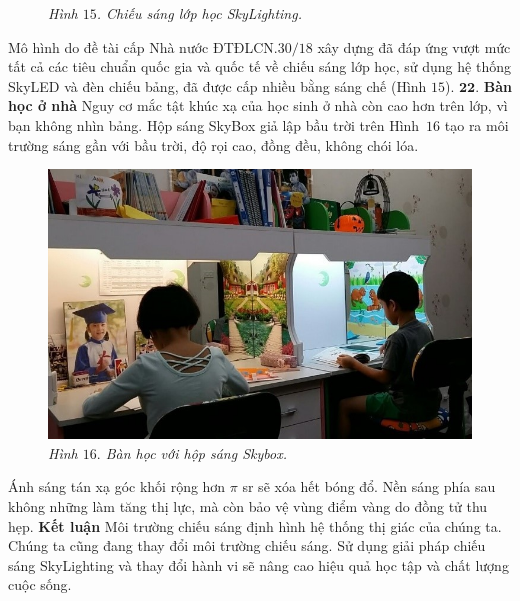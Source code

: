 \begin{multicols}{2}
\begin{figure}[H]
		\caption{\small\textit{\color{timhieukhoahoc}Hình $15$. Chiếu sáng lớp học SkyLighting.}}
		\vspace*{-10pt}
	\end{figure}
	Mô hình do đề tài cấp Nhà nước ĐTĐLCN.$30/18$ xây dựng đã đáp ứng vượt mức tất cả các tiêu chuẩn quốc gia và quốc tế về chiếu sáng lớp học, sử dụng hệ thống SkyLED và đèn chiếu bảng, đã được cấp nhiều bằng sáng chế (Hình $15$).
	\vskip 0.1cm
	$\pmb{22.}$ \textbf{\color{timhieukhoahoc}Bàn học ở nhà}
	\vskip 0.1cm
	Nguy cơ mắc tật khúc xạ của học sinh ở nhà còn cao hơn trên lớp, vì bạn không nhìn bảng. Hộp sáng SkyBox giả lập bầu trời trên Hình~$16$ tạo ra môi trường sáng gần với bầu trời, độ rọi cao, đồng đều, không chói lóa. 
	\begin{figure}[H]
		\vspace*{-5pt}
		\centering
		\captionsetup{labelformat= empty, justification=centering}
		\includegraphics[width= 1\linewidth]{16}
		\caption{\small\textit{\color{timhieukhoahoc}Hình $16.$ Bàn học với hộp sáng Skybox.}}
		\vspace*{-5pt}
	\end{figure}
	Ánh sáng tán xạ góc khối rộng hơn $\pi$ sr sẽ xóa hết bóng đổ. Nền sáng phía sau không những làm tăng thị lực, mà còn bảo vệ vùng điểm vàng do đồng tử thu hẹp. 
	\vskip 0.1cm
	\textbf{\color{timhieukhoahoc}Kết luận}
	\vskip 0.1cm
	Môi trường chiếu sáng định hình hệ thống thị giác của chúng ta. Chúng ta cũng đang thay đổi môi trường chiếu sáng. Sử dụng giải pháp chiếu sáng SkyLighting và thay đổi hành vi sẽ nâng cao hiệu quả học tập và chất lượng cuộc sống. 
\end{multicols}